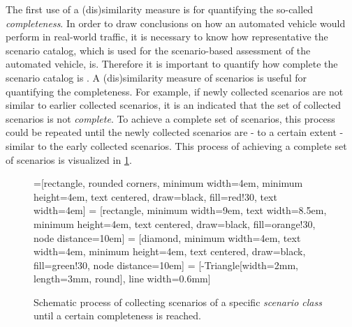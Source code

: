 \documentclass[10pt,final,a4paper,oneside,onecolumn]{article}
\theoremstyle{plain}\newtheorem{definition}{Definition}[section]    %
\theoremstyle{definition}\newtheorem{example}{Example}[section]     %
\theoremstyle{remark}\newtheorem{remarkenv}{Remark}[section]        %
\begin{document}
The first use of a (dis)similarity measure is for quantifying the so-called \emph{completeness}. In order to draw conclusions on how an automated vehicle would perform in real-world traffic, it is necessary to know how representative the scenario catalog, which is used for the scenario-based assessment of the automated vehicle, is. Therefore it is important to quantify how complete the scenario catalog is \cite{geyer2014, alvarez2017prospective, stellet2015taxonomy}. A (dis)similarity measure of scenarios is useful for quantifying the completeness. For example, if newly collected scenarios are not similar to earlier collected scenarios, it is an indicated that the set of collected scenarios is not \emph{complete}. To achieve a complete set of scenarios, this process could be repeated until the newly collected scenarios are - to a certain extent - similar to the early collected scenarios. This process of achieving a complete set of scenarios is visualized in \cref{fig:completeness collection}.

\begin{figure}[b]
	\centering
	=[rectangle, rounded corners, minimum width=4em, minimum height=4em, text centered, draw=black, fill=red!30, text width=4em]
	 = [rectangle, minimum width=9em, text width=8.5em, minimum height=4em, text centered, draw=black, fill=orange!30, node distance=10em]
	 = [diamond, minimum width=4em, text width=4em, minimum height=4em, text centered, draw=black, fill=green!30, node distance=10em]
	 = [-{Triangle[width=2mm, length=3mm, round]}, line width=0.6mm] %
	\caption{Schematic process of collecting scenarios of a specific \emph{scenario class} until a certain completeness is reached.}
	\label{fig:completeness collection}
\end{figure}
\end{document}
